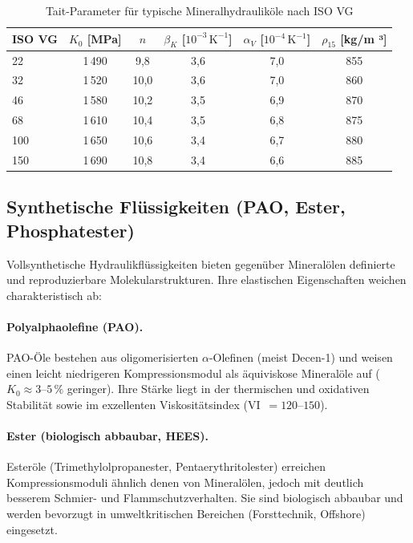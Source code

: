 ﻿\documentclass[a4paper,12pt]{scrreprt}
\theoremstyle{definition}
\begin{document}
\begin{table}[H]
  \centering
  \caption{Tait-Parameter für typische Mineralhydrauliköle nach ISO VG}
  \label{tab:tait_parameter}
  \begin{tabular}{lccccc}
    \toprule
    ISO VG & $K_0$ [MPa] & $n$ & $\beta_K$ [$10^{-3}\,\mathrm{K}^{-1}$]
      & $\alpha_V$ [$10^{-4}\,\mathrm{K}^{-1}$] & $\rho_{15}$ [kg/m ³] \\
    \midrule
    22   & 1\,490 & 9{,}8  & 3{,}6 & 7{,}0 & 855 \\
    32   & 1\,520 & 10{,}0 & 3{,}6 & 7{,}0 & 860 \\
    46   & 1\,580 & 10{,}2 & 3{,}5 & 6{,}9 & 870 \\
    68   & 1\,610 & 10{,}4 & 3{,}5 & 6{,}8 & 875 \\
    100  & 1\,650 & 10{,}6 & 3{,}4 & 6{,}7 & 880 \\
    150  & 1\,690 & 10{,}8 & 3{,}4 & 6{,}6 & 885 \\
    \bottomrule
  \end{tabular}
\end{table}

\subsection{Synthetische Flüssigkeiten (PAO, Ester, Phosphatester)}

Vollsynthetische Hydraulikflüssigkeiten bieten gegenüber Mineralölen
definierte und reproduzierbare Molekularstrukturen. Ihre elastischen
Eigenschaften weichen charakteristisch ab:

\paragraph{Polyalphaolefine (PAO).}
PAO-Öle bestehen aus oligomerisierten $\alpha$-Olefinen (meist Decen-1)
und weisen einen leicht niedrigeren Kompressionsmodul als äquiviskose
Mineralöle auf ($K_0 \approx 3$--$5\,\%$ geringer). Ihre Stärke liegt
in der thermischen und oxidativen Stabilität sowie im exzellenten
Viskositätsindex (VI~$= 120$--$150$).

\paragraph{Ester (biologisch abbaubar, HEES).}
Esteröle (Trimethylolpropanester, Pentaerythritolester) erreichen
Kompressionsmoduli ähnlich denen von Mineralölen, jedoch mit deutlich
besserem Schmier- und Flammschutzverhalten. Sie sind biologisch abbaubar
und werden bevorzugt in umweltkritischen Bereichen (Forsttechnik, Offshore)
eingesetzt.
\end{document}
